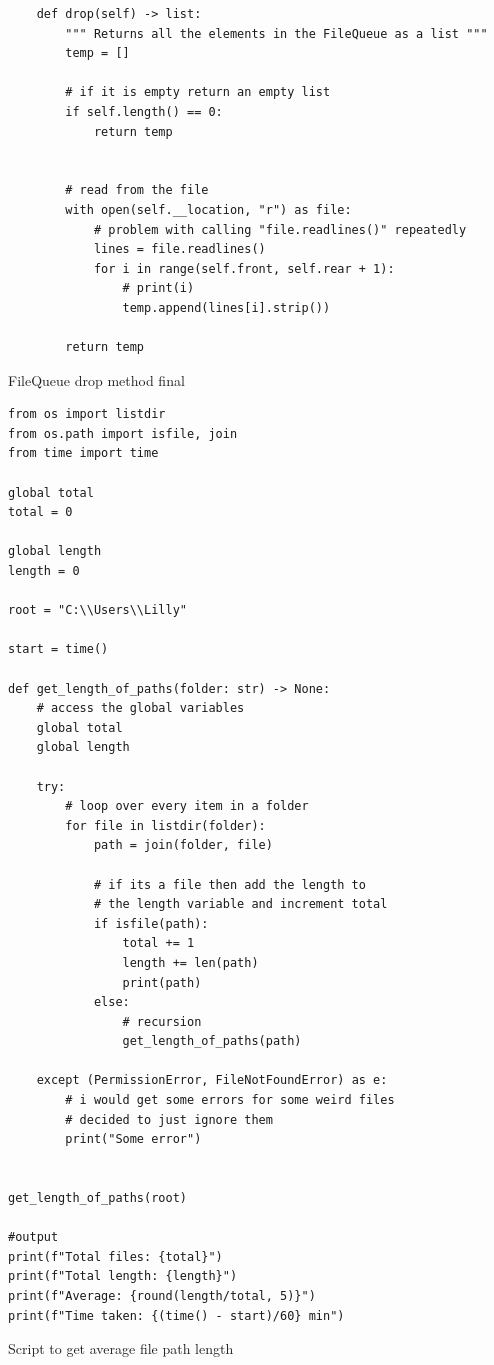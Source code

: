 \documentclass[11pt]{article}
\begin{document}
        \newpage
        \begin{listing}[!h]
            \begin{verbatim}
    def drop(self) -> list:
        """ Returns all the elements in the FileQueue as a list """
        temp = []
        
        # if it is empty return an empty list
        if self.length() == 0:
            return temp
        
        
        # read from the file
        with open(self.__location, "r") as file:
            # problem with calling "file.readlines()" repeatedly
            lines = file.readlines()
            for i in range(self.front, self.rear + 1):
                # print(i)
                temp.append(lines[i].strip())
                
        return temp
            \end{verbatim}
            \caption{FileQueue drop method final}
            \label{sc:fileq-drop-method-final}
        \end{listing}


        \newpage
        \begin{listing}[!h]
            \begin{verbatim}
from os import listdir
from os.path import isfile, join
from time import time

global total
total = 0

global length
length = 0

root = "C:\\Users\\Lilly"

start = time()

def get_length_of_paths(folder: str) -> None:
    # access the global variables
    global total
    global length
    
    try:
        # loop over every item in a folder 
        for file in listdir(folder):
            path = join(folder, file)
            
            # if its a file then add the length to 
            # the length variable and increment total
            if isfile(path):
                total += 1
                length += len(path)
                print(path)
            else:
                # recursion
                get_length_of_paths(path)
                
    except (PermissionError, FileNotFoundError) as e: 
        # i would get some errors for some weird files
        # decided to just ignore them 
        print("Some error")
            
            
get_length_of_paths(root)

#output
print(f"Total files: {total}")
print(f"Total length: {length}")
print(f"Average: {round(length/total, 5)}")
print(f"Time taken: {(time() - start)/60} min")
            \end{verbatim}
            \caption{Script to get average file path length}
            \label{sc:avg-filepath-length-file}
        \end{listing}

        





        
\end{document}
